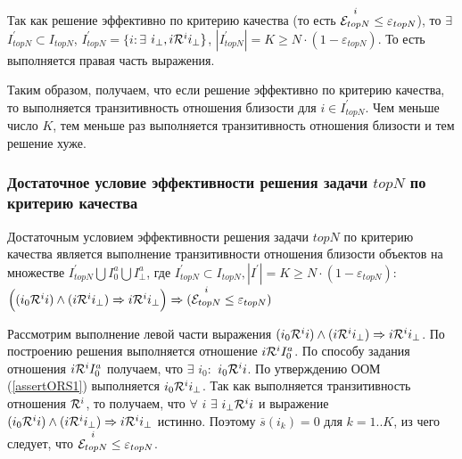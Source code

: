 Так как решение эффективно по критерию качества (то есть ${\overset{i}{\mathcal{E}_{topN}}} \le \varepsilon_{topN}$), то $\exists$ $I^{\prime}_{topN} \subset I_{topN}$,
$I^{\prime}_{topN} = \{ i: \exists$ $i_{\bot}, i \mathcal{R}^i i_{\bot} \}$,
$|I^{\prime}_{topN}| = K \ge N \cdot (1 - \varepsilon_{topN})$. То есть выполняется
правая часть выражения.

Таким образом, получаем, что если решение эффективно по критерию качества, то выполняется
транзитивность отношения близости для $i \in I^{\prime}_{topN}$.
Чем меньше число $K$, тем меньше раз выполняется транзитивность
отношения близости и тем решение хуже.

\subsubsection{Достаточное условие эффективности решения задачи $topN$ по
критерию качества}
\begin{trm} \label{ass:suf-topnsolve-ors}
Достаточным условием эффективности решения задачи $topN$ по критерию качества является
выполнение транзитивности отношения близости объектов на множестве
	$I^{\prime}_{topN} \bigcup I^a_0 \bigcup I^a_{\bot}$, где
	$I^{\prime}_{topN} \subset I_{topN}, |I^{\prime}| = K \ge N \cdot (1 -
	\varepsilon_{topN})$:
$\Big((i_0 \mathcal{R}^i i) \wedge (i \mathcal{R}^i i_{\bot})
\Rightarrow i \mathcal{R}^i i_{\bot} \Big) \Rightarrow ({\overset{i}{\mathcal{E}_{topN}}} \le \varepsilon_{topN})$
\end{trm}

Рассмотрим выполнение левой части выражения
$(i_0 \mathcal{R}^i i) \wedge (i \mathcal{R}^i i_{\bot}) \Rightarrow i \mathcal{R}^i i_{\bot}$.
По построению решения выполняется отношение $i \mathcal{R}^i I^a_0$.
По способу задания отношения $i \mathcal{R}^i I^a_0$ получаем, что
$\exists$ $i_0:$ $i_0 \mathcal{R}^i i$. По утверждению ООМ (\ref{assertORS1})
выполняется $i_0 \mathcal{R}^i i_{\bot}$. Так как выполняется транзитивность
отношения $\mathcal{R}^i$, то получаем, что $\forall$ $i$
$\exists$ $i_{\bot} \mathcal{R}^i i$ и выражение $(i_0 \mathcal{R}^i i) \wedge (i \mathcal{R}^i i_{\bot})
\Rightarrow i \mathcal{R}^i i_{\bot}$ истинно. Поэтому $\overline{s}(i_k) = 0$
для $k=1..K$, из чего следует, что ${\overset{i}{\mathcal{E}_{topN}}} \le \varepsilon_{topN}$.


